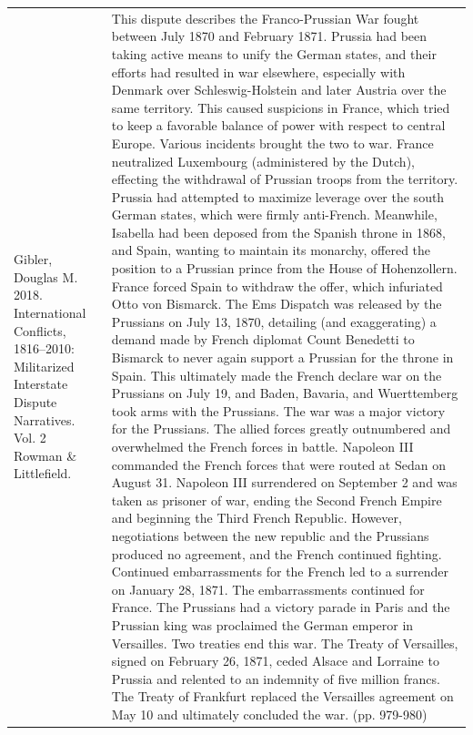 {\begin{longtable}{p{}p{}}
Gibler, Douglas M. 2018. International Conflicts, 1816–2010: Militarized Interstate Dispute Narratives. Vol. 2 Rowman \& Littlefield. & This dispute describes the Franco-Prussian War fought between July 1870 and February 1871. Prussia had been taking active means to unify the German states, and their efforts had resulted in war elsewhere, especially with Denmark over Schleswig-Holstein and later Austria over the same territory. This caused suspicions in France, which tried to keep a favorable balance of power with respect to central Europe. Various incidents brought the two to war. France neutralized Luxembourg (administered by the Dutch), effecting the withdrawal of Prussian troops from the territory. Prussia had attempted to maximize leverage over the south German states, which were firmly anti-French. Meanwhile, Isabella had been deposed from the Spanish throne in 1868, and Spain, wanting to maintain its monarchy, offered the position to a Prussian prince from the House of Hohenzollern. France forced Spain to withdraw the offer, which infuriated Otto von Bismarck. The Ems Dispatch was released by the Prussians on July 13, 1870, detailing (and exaggerating) a demand made by French diplomat Count Benedetti to Bismarck to never again support a Prussian for the throne in Spain. This ultimately made the French declare war on the Prussians on July 19, and Baden, Bavaria, and Wuerttemberg took arms with the Prussians. The war was a major victory for the Prussians. The allied forces greatly outnumbered and overwhelmed the French forces in battle. Napoleon III commanded the French forces that were routed at Sedan on August 31. Napoleon III surrendered on September 2 and was taken as prisoner of war, ending the Second French Empire and beginning the Third French Republic. However, negotiations between the new republic and the Prussians produced no agreement, and the French continued fighting. Continued embarrassments for the French led to a surrender on January 28, 1871. The embarrassments continued for France. The Prussians had a victory parade in Paris and the Prussian king was proclaimed the German emperor in Versailles. Two treaties end this war. The Treaty of Versailles, signed on February 26, 1871, ceded Alsace and Lorraine to Prussia and relented to an indemnity of five million francs. The Treaty of Frankfurt replaced the Versailles agreement on May 10 and ultimately concluded the war. (pp. 979-980)
\\

\end{longtable}}
